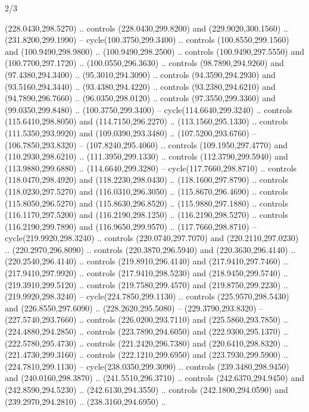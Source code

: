 \begin{flagdescription}{2/3}
\begin{scope}[xshift=0.5\flaglength,yshift=0.5\flagwidth,scale=\stretchfactor]
\begin{scope}[scale=0.001645\flagwidth,yshift=65mm,xshift=-63mm]
\begin{scope}[y=0.80pt, x=0.80pt, yscale=-1,]
\begin{scope}[cm={{1.33333,0.0,0.0,1.33333,(0.0,1e-05)}}]
  (228.0430,298.5270) .. controls (228.0430,299.8200) and (229.9020,300.1560) ..
  (231.8200,299.1990) -- cycle(100.3750,299.3400) .. controls
  (100.8550,299.1560) and (100.9490,298.9800) .. (100.9490,298.2500) .. controls
  (100.9490,297.5550) and (100.7700,297.1720) .. (100.0550,296.3630) .. controls
  (98.7890,294.9260) and (97.4380,294.3400) .. (95.3010,294.3090) .. controls
  (94.3590,294.2930) and (93.5160,294.3440) .. (93.4380,294.4220) .. controls
  (93.2380,294.6210) and (94.7890,296.7660) .. (96.0350,298.0120) .. controls
  (97.3550,299.3360) and (99.0350,299.8480) .. (100.3750,299.3400) --
  cycle(114.6640,299.3240) .. controls (115.6410,298.8050) and
  (114.7150,296.2270) .. (113.1560,295.1330) .. controls (111.5350,293.9920) and
  (109.0390,293.3480) .. (107.5200,293.6760) -- (106.7850,293.8320) --
  (107.8240,295.4060) .. controls (109.1950,297.4770) and (110.2930,298.6210) ..
  (111.3950,299.1330) .. controls (112.3790,299.5940) and (113.9880,299.6880) ..
  (114.6640,299.3280) -- cycle(117.7660,298.8710) .. controls
  (118.0470,298.4920) and (118.2230,298.0430) .. (118.1600,297.8790) .. controls
  (118.0230,297.5270) and (116.0310,296.3050) .. (115.8670,296.4690) .. controls
  (115.8050,296.5270) and (115.8630,296.8520) .. (115.9880,297.1880) .. controls
  (116.1170,297.5200) and (116.2190,298.1250) .. (116.2190,298.5270) .. controls
  (116.2190,299.7890) and (116.9650,299.9570) .. (117.7660,298.8710) --
  cycle(219.9920,298.3240) .. controls (220.0740,297.7070) and
  (220.2110,297.0230) .. (220.2970,296.8090) .. controls (220.3870,296.5940) and
  (220.3630,296.4140) .. (220.2540,296.4140) .. controls (219.8910,296.4140) and
  (217.9410,297.7460) .. (217.9410,297.9920) .. controls (217.9410,298.5230) and
  (218.9450,299.5740) .. (219.3910,299.5120) .. controls (219.7580,299.4570) and
  (219.8750,299.2230) .. (219.9920,298.3240) -- cycle(224.7850,299.1130) ..
  controls (225.9570,298.5430) and (226.8550,297.6090) .. (228.2620,295.5080) --
  (229.3790,293.8320) -- (227.5740,293.7660) .. controls (226.0200,293.7110) and
  (225.5860,293.7850) .. (224.4880,294.2850) .. controls (223.7890,294.6050) and
  (222.9300,295.1370) .. (222.5780,295.4730) .. controls (221.2420,296.7380) and
  (220.6410,298.8320) .. (221.4730,299.3160) .. controls (222.1210,299.6950) and
  (223.7930,299.5900) .. (224.7810,299.1130) -- cycle(238.0350,299.3090) ..
  controls (239.3480,298.9450) and (240.0160,298.3870) .. (241.5510,296.3710) ..
  controls (242.6370,294.9450) and (242.8590,294.5230) .. (242.6130,294.3550) ..
  controls (242.1800,294.0590) and (239.2970,294.2810) .. (238.3160,294.6950) ..

\end{scope}
\end{scope}
\end{scope}
\end{scope}
\end{flagdescription}

